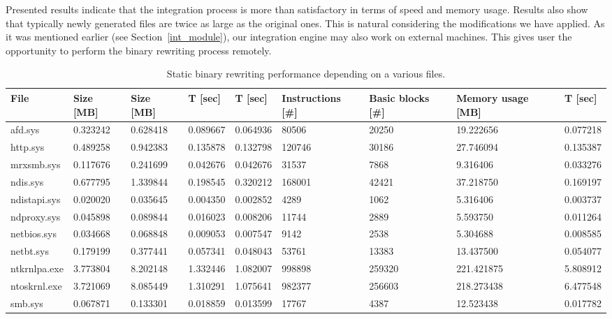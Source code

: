 \documentclass[10pt,twocolumn,a4paper]{article}
\begin{document}
Presented results indicate that the integration process is more than satisfactory in terms of speed and memory usage. Results also show that typically newly generated files are twice as large as the original ones. This is natural considering the modifications we have applied. As it was mentioned earlier (see Section~\ref{int_module}), our integration engine may also work on external machines. This gives user the opportunity to perform the binary rewriting process remotely.

\begin{table*}[!ht]
  \centering
  \caption{Static binary rewriting performance depending on a various files.}
\begin{tabular}{|p{1.75cm}|p{1.3cm}|p{1.3cm}|p{1.4cm}|p{1.45cm}|p{1.60cm}|p{1.55cm}|p{1.7cm}|p{1.35cm}|}
    \addlinespace
    \toprule
    File & Size [MB]& Size [MB] & T [sec] & T [sec] & Instructions [\#] & Basic blocks [\#] & Memory usage [MB] & T [sec]\\
    \midrule
    afd.sys & 0.323242 & 0.628418 & 0.089667 & 0.064936 & 80506 & 20250 & 19.222656 & 0.077218 \\
    \hline
    http.sys & 0.489258 & 0.942383 & 0.135878 & 0.132798 & 120746 & 30186 & 27.746094 & 0.135387 \\
    \hline
    mrxsmb.sys & 0.117676 & 0.241699 & 0.042676 & 0.042676 & 31537 & 7868  & 9.316406 & 0.033276 \\
    \hline
    ndis.sys & 0.677795  & 1.339844 & 0.198545 & 0.320212 & 168001 & 42421 & 37.218750 & 0.169197 \\
    \hline
    ndistapi.sys & 0.020020 & 0.035645  & 0.004350 & 0.002852 & 4289  & 1062  & 5.316406 & 0.003737 \\
    \hline
    ndproxy.sys & 0.045898 & 0.089844 & 0.016023 & 0.008206 & 11744 & 2889  & 5.593750  & 0.011264  \\
    \hline
    netbios.sys & 0.034668  & 0.068848 & 0.009053 & 0.007547 & 9142  & 2538  & 5.304688 & 0.008585 \\
    \hline
    netbt.sys & 0.179199  & 0.377441 & 0.057341 & 0.048043 & 53761 & 13383 & 13.437500 & 0.054077 \\
    \hline
    ntkrnlpa.exe & 3.773804 & 8.202148 & 1.332446 & 1.082007 & 998898 & 259320 & 221.421875 & 5.808912 \\
    \hline
    ntoskrnl.exe & 3.721069 & 8.085449 & 1.310291 & 1.075641 & 982377 & 256603 & 218.273438 & 6.477548 \\
    \hline
    smb.sys & 0.067871 & 0.133301 & 0.018859 & 0.013599 & 17767 & 4387  & 12.523438  & 0.017782 \\

\end{tabular}
\end{table*}
\end{document}
